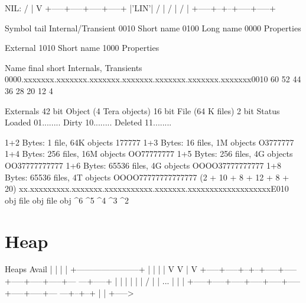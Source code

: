 \begin{wideverbatim}


   NIL:  /
         |
         V
   +-----+-----+-----+-----+
   |'LIN'|  /  |  /  |  /  |
   +-----+--+--+-----+-----+

Symbol tail
   Internal/Transient
      0010 Short name
      0100 Long name
      0000 Properties

   External
      1010 Short name
      1000 Properties

Name final short
   Internals, Transients
      0000.xxxxxxx.xxxxxxx.xxxxxxx.xxxxxxx.xxxxxxx.xxxxxxx.xxxxxxx0010
        60      52      44      36      28      20      12       4


   Externals
      42 bit Object (4 Tera objects)
      16 bit File (64 K files)
       2 bit Status
         Loaded    01........
         Dirty     10........
         Deleted   11........

      1+2 Bytes: 1 file, 64K objects                  {177777}
      1+3 Bytes: 16 files, 1M objects               {O3777777}
      1+4 Bytes: 256 files, 16M objects           {OO77777777}
      1+5 Bytes: 256 files, 4G objects         {OO37777777777}
      1+6 Bytes: 65536 files, 4G objects     {OOOO37777777777}
      1+8 Bytes: 65536 files, 4T objects  {OOOO77777777777777}
      (2 + 10 + 8 + 12 + 8 + 20)
      xx.xxxxxxxxx.xxxxxxx.xxxxxxxxxxx.xxxxxxx.xxxxxxxxxxxxxxxxxxxE010
        obj       file    obj         file    obj
                  ^6      ^5      ^4      ^3      ^2
\end{wideverbatim}



\section{Heap}
\label{sec:internal-structures-heap}


\begin{wideverbatim}
Heaps       Avail
|           |
|           |  +-----------------------+
|           |  |                       |
V           V  |                       V
+-----+-----+--+--+-----+-----+-----+-----+-----+---     ---+-----+
|           |  |  |     |           |  /  |     |    ...    |  |  |
+-----+-----+-----+-----+-----+-----+-----+-----+---     ---+--+--+
                                                               |
                                                               |
                                                               +----->

\end{wideverbatim}

